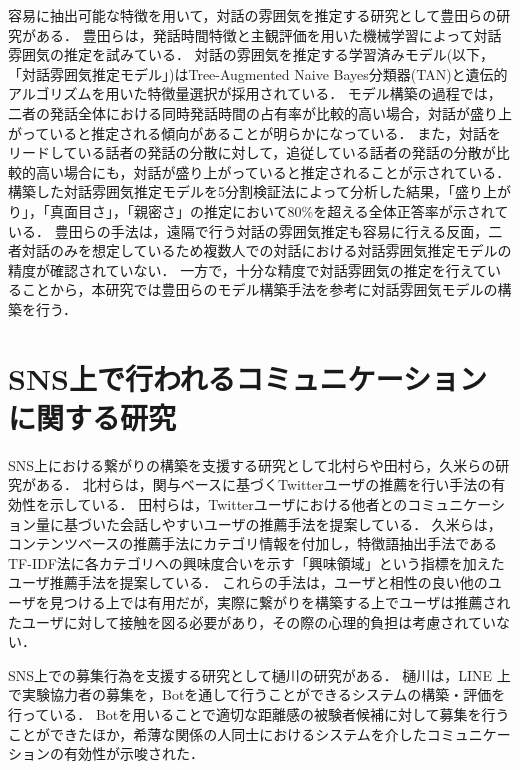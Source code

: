 容易に抽出可能な特徴を用いて，対話の雰囲気を推定する研究として豊田ら\cite{Toyota}の研究がある．
豊田らは，発話時間特徴と主観評価を用いた機械学習によって対話雰囲気の推定を試みている．
対話の雰囲気を推定する学習済みモデル(以下，「対話雰囲気推定モデル」)はTree-Augmented Naive Bayes分類器(TAN)と遺伝的アルゴリズムを用いた特徴量選択が採用されている．
モデル構築の過程では，二者の発話全体における同時発話時間の占有率が比較的高い場合，対話が盛り上がっていると推定される傾向があることが明らかになっている．
また，対話をリードしている話者の発話の分散に対して，追従している話者の発話の分散が比較的高い場合にも，対話が盛り上がっていると推定されることが示されている．
構築した対話雰囲気推定モデルを5分割検証法によって分析した結果，「盛り上がり」，「真面目さ」，「親密さ」の推定において80\%を超える全体正答率が示されている．
豊田らの手法は，遠隔で行う対話の雰囲気推定も容易に行える反面，二者対話のみを想定しているため複数人での対話における対話雰囲気推定モデルの精度が確認されていない．
一方で，十分な精度で対話雰囲気の推定を行えていることから，本研究では豊田らのモデル構築手法を参考に対話雰囲気モデルの構築を行う．

\section{SNS上で行われるコミュニケーションに関する研究}

SNS上における繋がりの構築を支援する研究として北村ら\cite{Kitamura}や田村ら\cite{Tamura}，久米ら\cite{Kume}の研究がある．
北村らは，関与ベースに基づくTwitterユーザの推薦を行い手法の有効性を示している．
田村らは，Twitterユーザにおける他者とのコミュニケーション量に基づいた会話しやすいユーザの推薦手法を提案している．
久米らは，コンテンツベースの推薦手法にカテゴリ情報を付加し，特徴語抽出手法であるTF-IDF法に各カテゴリへの興味度合いを示す「興味領域」という指標を加えたユーザ推薦手法を提案している．
これらの手法は，ユーザと相性の良い他のユーザを見つける上では有用だが，実際に繋がりを構築する上でユーザは推薦されたユーザに対して接触を図る必要があり，その際の心理的負担は考慮されていない．

SNS上での募集行為を支援する研究として樋川\cite{Hikawa}の研究がある．
樋川は，LINE \cite{LINE}上で実験協力者の募集を，Botを通して行うことができるシステムの構築・評価を行っている．
Botを用いることで適切な距離感の被験者候補に対して募集を行うことができたほか，希薄な関係の人同士におけるシステムを介したコミュニケーションの有効性が示唆された．
